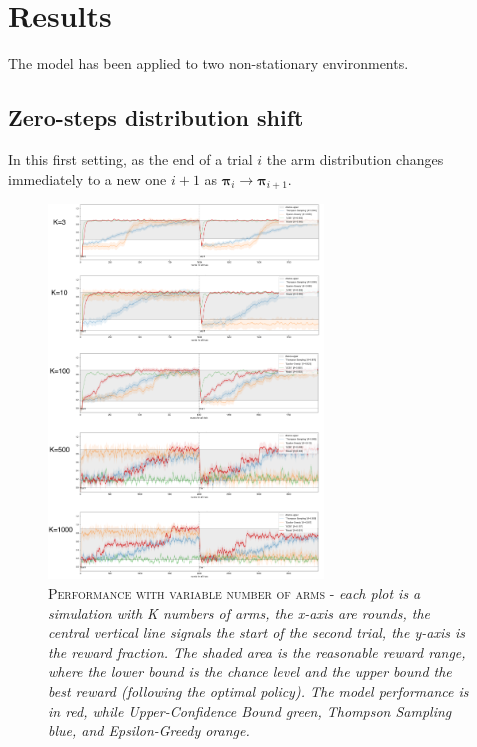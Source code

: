 
\section{Results}

The model has been applied to two non-stationary environments.

\subsection{Zero-steps distribution shift}
In this first setting, as the end of a trial $i$ the arm distribution changes immediately to a new one $i+1$ as $\mathbf{\pi}_{i} \to \mathbf{\pi}_{i+1}$.

\begin{figure}[h]
    \centering
    \includegraphics[width=0.65\textwidth]{figures/drawing.png}
    \caption{\textsc{Performance with variable number of arms} - \textit{each plot is a simulation with K numbers of arms, the x-axis are rounds, the central vertical line signals the start of the second trial, the y-axis is the reward fraction.
            The shaded area is the reasonable reward
    range, where the lower bound is the chance level and the upper bound the best reward (following the optimal policy). The model performance is in red, while Upper-Confidence Bound green, Thompson Sampling blue, and Epsilon-Greedy orange. }}
\label{fig:zero_1}
\end{figure}


